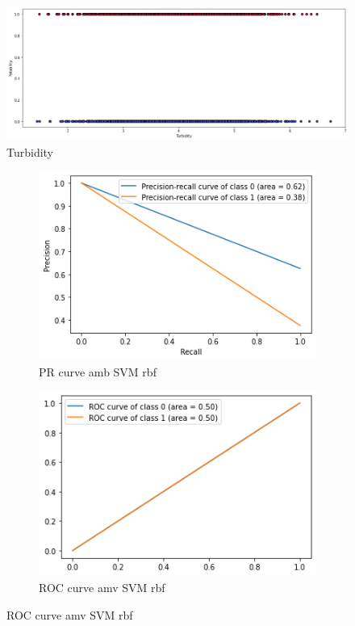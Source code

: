 \documentclass{article}
\begin{document}
\begin{figure}[!h]
	\centering
	\includegraphics[width=0.7\linewidth]{../images/turbidity}
	\caption*{Turbidity}
	\label{fig:aa-ph}
\end{figure}
\begin{figure}[!h]
	\centering
	\begin{subfigure}[b]{0.4\textwidth}
		\centering
		\includegraphics[width=\textwidth]{../images/bb1}
		\caption*{PR curve amb SVM rbf}
		\label{fig:knn}
	\end{subfigure}
	\begin{subfigure}[b]{0.4\textwidth}
		\centering
		\includegraphics[width=\textwidth]{../images/bb2}
		\caption*{ROC curve amv SVM rbf}
		\label{fig:three sin x}
	\end{subfigure}
\end{figure}
\end{document}
